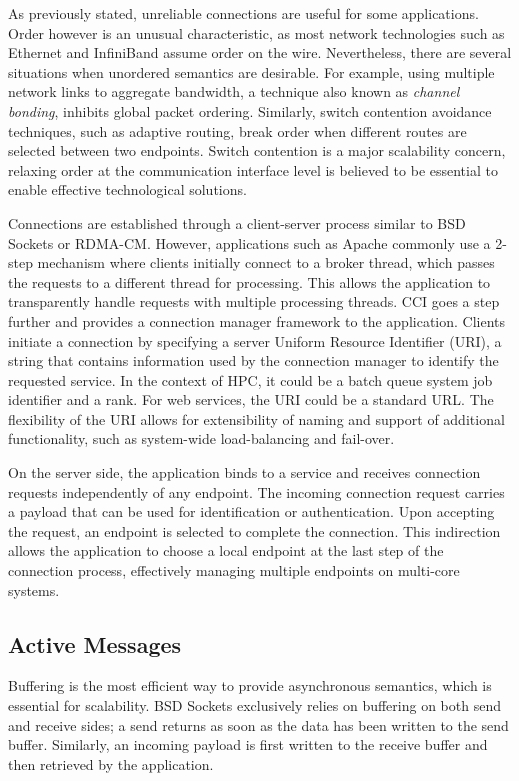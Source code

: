 As previously stated, unreliable connections are useful for some applications. 
Order however is an unusual characteristic, as most network technologies such 
as Ethernet and InfiniBand assume order on the wire. 
Nevertheless, there are several situations when unordered semantics are 
desirable. For example, using multiple network links to aggregate bandwidth, 
a technique also known as \emph{channel bonding}, inhibits global packet ordering. 
Similarly, switch contention avoidance techniques, 
such as adaptive routing,  break order when different routes are selected 
between two endpoints. Switch contention is a major scalability concern, 
relaxing order at the communication interface level is believed to be 
essential to enable effective technological solutions.

Connections are established through a client-server process similar to 
BSD Sockets or RDMA-CM. However, applications such as 
Apache commonly use a 2-step mechanism where clients 
initially connect to a broker thread, which passes the requests to a 
different thread for processing. This allows the application to 
transparently handle requests with multiple processing threads.
CCI goes a step further and provides a connection manager framework to 
the application. Clients initiate a connection by specifying a server 
Uniform Resource Identifier (URI), a string that contains information used 
by the connection manager to identify the requested service. In the context of 
HPC, it could be a batch queue system job identifier and a rank. For web 
services, the URI could be a standard URL. The flexibility of the URI allows 
for extensibility of naming and support of additional functionality, such as 
system-wide load-balancing and fail-over.

On the server side, the application binds to a service and receives 
connection requests independently of any endpoint. The incoming connection 
request carries a payload that can be used for identification or authentication. 
Upon accepting the request, an endpoint is selected to complete the 
connection. This indirection allows the application to choose a local endpoint 
at the last step of the connection process, effectively managing multiple 
endpoints on multi-core systems.

\subsection{Active Messages}
Buffering is the most efficient way to provide asynchronous semantics, which 
is essential for scalability. BSD Sockets exclusively relies on buffering on both 
send and receive sides; a send returns as soon as the data has been 
written to the send buffer. Similarly, an incoming payload is first 
written to the receive buffer and then retrieved by the application.

